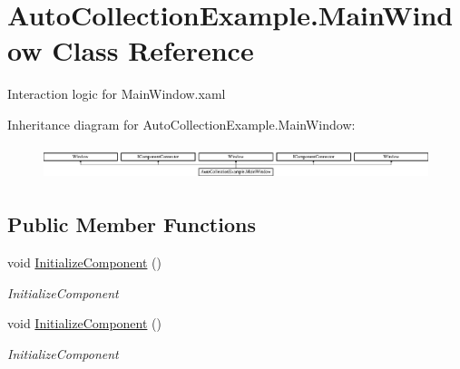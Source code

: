 \hypertarget{class_auto_collection_example_1_1_main_window}{}\section{Auto\+Collection\+Example.\+Main\+Window Class Reference}
\label{class_auto_collection_example_1_1_main_window}


Interaction logic for Main\+Window.\+xaml  


Inheritance diagram for Auto\+Collection\+Example.\+Main\+Window\+:\begin{figure}[H]
\begin{center}
\leavevmode
\includegraphics[height=0.995556cm]{dc/dc5/class_auto_collection_example_1_1_main_window}
\end{center}
\end{figure}
\subsection*{Public Member Functions}
\begin{DoxyCompactItemize}
\item 
void \mbox{\hyperlink{class_auto_collection_example_1_1_main_window_ae5609e98fc6e36d1bcaeec71b0282ed6}{Initialize\+Component}} ()
\begin{DoxyCompactList}\small\item\em Initialize\+Component \end{DoxyCompactList}\item 
void \mbox{\hyperlink{class_auto_collection_example_1_1_main_window_ae5609e98fc6e36d1bcaeec71b0282ed6}{Initialize\+Component}} ()
\begin{DoxyCompactList}\small\item\em Initialize\+Component \end{DoxyCompactList}\end{DoxyCompactItemize}
